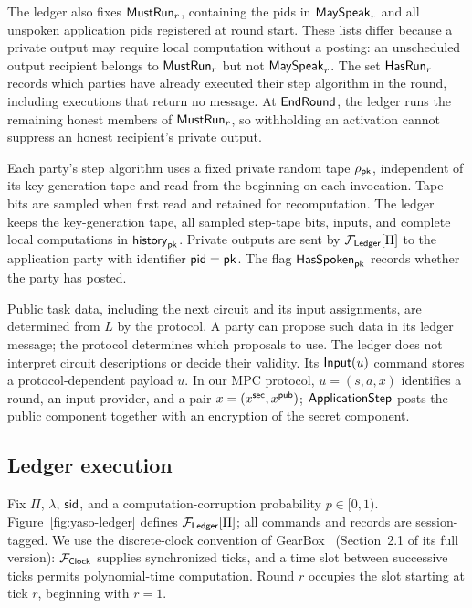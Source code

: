 The ledger also fixes $\mathsf{MustRun}_r$, containing the pids in
$\mathsf{MaySpeak}_r$ and all unspoken application pids registered at round start.
These lists differ because a private output may require local computation
without a posting: an unscheduled output recipient belongs to $\mathsf{MustRun}_r$
but not $\mathsf{MaySpeak}_r$.
The set $\mathsf{HasRun}_r$ records which parties have already executed their step
algorithm in the round, including executions that return no message.
At $\mathsf{EndRound}$, the ledger runs the remaining honest members of
$\mathsf{MustRun}_r$, so withholding an activation cannot suppress an honest
recipient's private output.

Each party's step algorithm uses a fixed private random tape $\rho_{\mathsf{pk}}$,
independent of its key-generation tape and read from the beginning on
each invocation.  Tape bits are sampled when first read and retained for
recomputation.  The ledger keeps the key-generation tape, all sampled
step-tape bits, inputs, and complete local computations in $\mathsf{history}_{\mathsf{pk}}$.
Private outputs are sent by $\mathcal F_{\mathsf{Ledger}}[\Pi]$ to the application party
with identifier $\mathsf{pid}=\mathsf{pk}$.
The flag $\mathsf{HasSpoken}_{\mathsf{pk}}$ records whether the party has posted.

Public task data, including the next circuit and its input assignments,
are determined from $L$ by the protocol.  A party can propose such data
in its ledger message; the protocol determines which proposals to use.
The ledger does not interpret circuit descriptions or decide their validity.
Its $\mathsf{Input}(u)$ command stores a protocol-dependent payload $u$.
In our MPC protocol, $u=(s,a,x)$ identifies a round, an input provider,
and a pair $x=(x^{\mathsf{sec}},x^{\mathsf{pub}})$; $\mathsf{ApplicationStep}$ posts the public
component together with an encryption of the secret component.

\subsection{Ledger execution}
\label{sec:ledger-execution}

Fix $\Pi$, $\lambda$, $\mathsf{sid}$, and a computation-corruption probability
$p\in[0,1)$.  Figure~\ref{fig:yaso-ledger} defines
$\mathcal F_{\mathsf{Ledger}}[\Pi]$; all commands and records are session-tagged.
We use the discrete-clock convention of GearBox~\cite{DavidEtAl2022GearBox}
(Section~2.1 of its full version): $\mathcal F_{\mathsf{Clock}}$ supplies synchronized ticks,
and a time slot between successive ticks permits polynomial-time
computation.  Round $r$ occupies the slot starting at tick $r$, beginning
with $r=1$.

